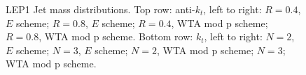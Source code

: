 \begin{figure}[H]
\hfill
{}\hfill
{}\hfill
\caption{LEP1 Jet mass distributions. Top row: anti-$k_t$, left to right: $R=0.4$, $E$ scheme; $R=0.8$, $E$ scheme; $R=0.4$, WTA mod p scheme; $R=0.8$, WTA mod p scheme. Bottom row: $k_t$, left to right: $N=2$, $E$ scheme; $N=3$, $E$ scheme; $N=2$, WTA mod p scheme; $N=3$; WTA mod p scheme.}  
\end{figure}

